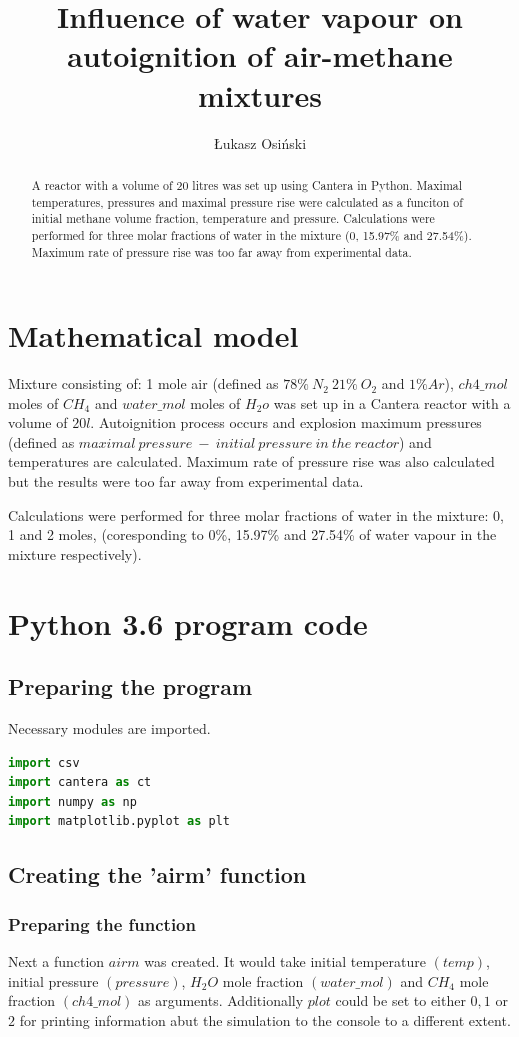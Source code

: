 \documentclass[a4paper]{article}
\title{Influence of water vapour on autoignition of air-methane mixtures}
\author{Łukasz Osiński}
\begin{document}
\maketitle

\begin{abstract}
A reactor with a volume of 20 litres was set up using Cantera in Python. Maximal temperatures, pressures and maximal pressure rise were calculated as a funciton of initial methane volume fraction, temperature and pressure. Calculations were performed for three molar fractions of water in the mixture (0, 15.97\% and 27.54\%). Maximum rate of pressure rise was too far away from experimental data.
\end{abstract}

\section{Mathematical model}
Mixture consisting of: 1 mole air (defined as $78\%\ N_2\ 21\%\ O_2$ and $1\%Ar$), $ch4\_mol$ moles of $CH_4$ and $water\_mol$ moles of $H_2o$ was set up in a Cantera reactor with a volume of $20 l$. Autoignition process occurs and explosion maximum pressures (defined as $maximal\ pressure\ -\ initial\ pressure\ in\ the\ reactor$) and temperatures are calculated. Maximum rate of pressure rise was also calculated but the results were too far away from experimental data.

Calculations were performed for three molar fractions of water in the mixture: 0, 1 and 2 moles, (coresponding to 0\%, 15.97\% and 27.54\% of water vapour in the mixture respectively).

\section{Python 3.6 program code}
\subsection{Preparing the program}
Necessary modules are imported.
\begin{lstlisting}[language=python]
import csv
import cantera as ct
import numpy as np
import matplotlib.pyplot as plt
\end{lstlisting}
\subsection{Creating the 'airm' function}
\subsubsection{Preparing the function}
Next a function $airm$ was created. It would take initial temperature $(temp)$, initial pressure $(pressure)$, $H_2O$ mole fraction $(water\_mol)$ and $CH_4$ mole fraction $(ch4\_mol)$ as arguments. Additionally $plot$ could be set to either $0, 1$ or $2$ for printing information abut the simulation to the console to a different extent. 
\end{document}
